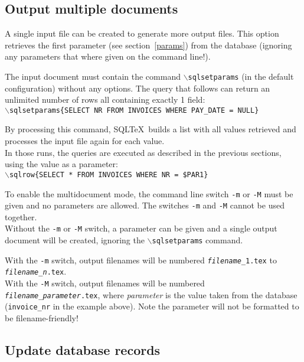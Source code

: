 \documentclass{article}
\newcommand{\bs}{\ensuremath{\backslash}}
\newcommand{\vs}{\vspace{3mm}}
\begin{document}
\subsection{Output multiple documents}\label{multidoc}

A single input file can be created to generate more output files. This option
retrieves the first parameter (see section~\ref{params}) from the database
(ignoring any parameters that where given on the command line!).

\vs

The input document must contain the command \texttt{\bs sqlsetparams} (in the
default configuration) without any options. The query that follows can return an
unlimited number of rows all containing exactly 1 field: \\
\texttt{\bs sqlsetparams\{SELECT NR FROM INVOICES WHERE PAY\_DATE = NULL\}}

\vs

By processing this command, SQL\TeX\ builds a list with all values retrieved and
processes the input file again for each value.\\
In those runs, the queries are executed as described in the previous sections,
using the value as a parameter:\\
\texttt{\bs sqlrow\{SELECT * FROM INVOICES WHERE NR = \$PAR1\}}

\vs

To enable the multidocument mode, the command line switch \texttt{-m} or \texttt{-M} must be
given and no parameters are allowed. The switches \texttt{-m} and \texttt{-M} cannot be used together.\\
Without the \texttt{-m} or \texttt{-M} switch, a parameter can be given and a single output
document will be created, ignoring the \texttt{\bs sqlsetparams} command.

\vs

With the \texttt{-m} switch, output filenames will be numbered \texttt{\emph{filename}\_1.tex} to \texttt{\emph{filename}\_\emph{n}.tex}.\\
With the \texttt{-M} switch, output filenames will be numbered \texttt{\emph{filename}\_\emph{parameter}.tex}, where \emph{parameter} is the value taken from the
database (\texttt{invoice\_nr} in the example above). Note the parameter will not be formatted to be filename-friendly!\\

\subsection{Update database records}
\end{document}

